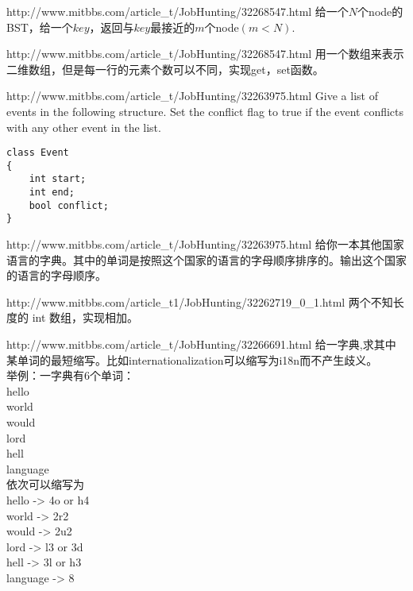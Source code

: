 \documentclass[a4paper]{article}
\begin{document}
\begin{CJK}{UTF8}{gbsn}
\begin{enumerate}
\begin{Q}[Facebook]{http://www.mitbbs.com/article_t/JobHunting/32268547.html}
给一个$N$个node的BST，给一个$key$，返回与$key$最接近的$m$个node$(m<N)$.
\end{Q}

\begin{Q}[Facebook]{http://www.mitbbs.com/article_t/JobHunting/32268547.html}
用一个数组来表示二维数组，但是每一行的元素个数可以不同，实现get，set函数。
\end{Q}

\begin{Q}{http://www.mitbbs.com/article_t/JobHunting/32263975.html}
Give a list of events in the following structure. Set the conflict flag to true if the event conflicts with any other event in the list.
\begin{lstlisting}
class Event
{
    int start;
    int end;
    bool conflict;
}
\end{lstlisting}
\end{Q}

\begin{Q}{http://www.mitbbs.com/article_t/JobHunting/32263975.html}
给你一本其他国家语言的字典。其中的单词是按照这个国家的语言的字母顺序排序的。输出这个国家的语言的字母顺序。
\end{Q}

\begin{Q}[Google]{http://www.mitbbs.com/article_t1/JobHunting/32262719_0_1.html}
两个不知长度的 int 数组，实现相加。
\end{Q}

\begin{Q}{http://www.mitbbs.com/article_t/JobHunting/32266691.html}
给一字典,求其中某单词的最短缩写。比如internationalization可以缩写为i18n而不产生歧义。\\
举例：一字典有6个单词：\\
hello\\
world\\
would\\
lord\\
hell\\
language\\
依次可以缩写为\\
hello -> 4o or h4\\
world -> 2r2\\
would -> 2u2\\
lord -> l3 or 3d\\
hell -> 3l or h3\\
language -> 8
\end{Q}


\end{enumerate}
\end{CJK}
\end{document}
